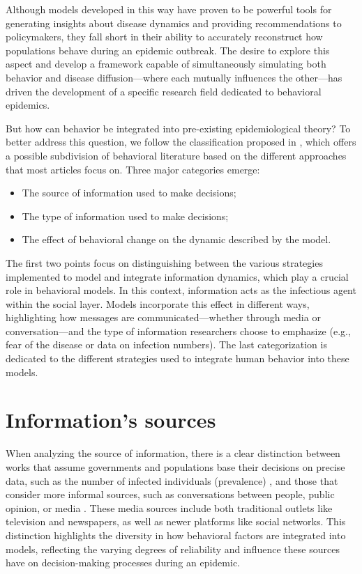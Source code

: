 Although models developed in this way have proven to be powerful tools for generating insights about disease dynamics and providing recommendations to policymakers, they fall short in their ability to accurately reconstruct how populations behave during an epidemic outbreak. The desire to explore this aspect and develop a framework capable of simultaneously simulating both behavior and disease diffusion—where each mutually influences the other—has driven the development of a specific research field dedicated to behavioral epidemics.

But how can behavior be integrated into pre-existing epidemiological theory? To better address this question, we follow the classification proposed in \cite{Funk_2010}, which offers a possible subdivision of behavioral literature based on the different approaches that most articles focus on. Three major categories emerge:
\begin{itemize}
	\item The source of information used to make decisions;
	\item The type of information used to make decisions;
	\item The effect of behavioral change on the dynamic described by  the model. 
\end{itemize}


The first two points focus on distinguishing between the various strategies implemented to model and integrate information dynamics, which play a crucial role in behavioral models. In this context, information acts as the infectious agent within the social layer. Models incorporate this effect in different ways, highlighting how messages are communicated—whether through media or conversation—and the type of information researchers choose to emphasize (e.g., fear of the disease or data on infection numbers). The last categorization is dedicated to the different strategies used to integrate human behavior into these models.
\section{Information's sources}
When analyzing the source of information, there is a clear distinction between works \cite{Vogiatzis2010} that assume governments and populations base their decisions on precise data, such as the number of infected individuals (prevalence) \cite{Collinson2014, Tyson_2020}, and those that consider more informal sources, such as conversations between people, public opinion, or media \cite{Bulai2023, Sontag2022}. These media sources include both traditional outlets like television and newspapers, as well as newer platforms like social networks.
This distinction highlights the diversity in how behavioral factors are integrated into models, reflecting the varying degrees of reliability and influence these sources have on decision-making processes during an epidemic.


